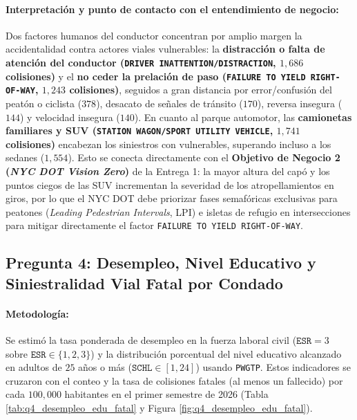 \documentclass[11pt,a4paper]{article}
\begin{document}
\paragraph{Interpretación y punto de contacto con el entendimiento de negocio:}
Dos factores humanos del conductor concentran por amplio margen la accidentalidad contra actores viales vulnerables: la \textbf{distracción o falta de atención del conductor (\texttt{DRIVER INATTENTION/DISTRACTION}, $1,686$ colisiones)} y el \textbf{no ceder la prelación de paso (\texttt{FAILURE TO YIELD RIGHT-OF-WAY}, $1,243$ colisiones)}, seguidos a gran distancia por error/confusión del peatón o ciclista ($378$), desacato de señales de tránsito ($170$), reversa insegura ($144$) y velocidad insegura ($140$). En cuanto al parque automotor, las \textbf{camionetas familiares y SUV (\texttt{STATION WAGON/SPORT UTILITY VEHICLE}, $1,741$ colisiones)} encabezan los siniestros con vulnerables, superando incluso a los sedanes ($1,554$). Esto se conecta directamente con el \textbf{Objetivo de Negocio 2 (\textit{NYC DOT Vision Zero})} de la Entrega 1: la mayor altura del capó y los puntos ciegos de las SUV incrementan la severidad de los atropellamientos en giros, por lo que el NYC DOT debe priorizar fases semafóricas exclusivas para peatones (\textit{Leading Pedestrian Intervals}, LPI) e isletas de refugio en intersecciones para mitigar directamente el factor \texttt{FAILURE TO YIELD RIGHT-OF-WAY}.

\subsection{Pregunta 4: Desempleo, Nivel Educativo y Siniestralidad Vial Fatal por Condado}
\label{subsec:respuesta_q4}

\paragraph{Metodología:} Se estimó la tasa ponderada de desempleo en la fuerza laboral civil ($\texttt{ESR} = 3$ sobre $\texttt{ESR} \in \{1, 2, 3\}$) y la distribución porcentual del nivel educativo alcanzado en adultos de $25$ años o más ($\texttt{SCHL} \in [1, 24]$) usando \texttt{PWGTP}. Estos indicadores se cruzaron con el conteo y la tasa de colisiones fatales (al menos un fallecido) por cada $100,000$ habitantes en el primer semestre de 2026 (Tabla \ref{tab:q4_desempleo_edu_fatal} y Figura \ref{fig:q4_desempleo_edu_fatal}).
\end{document}
